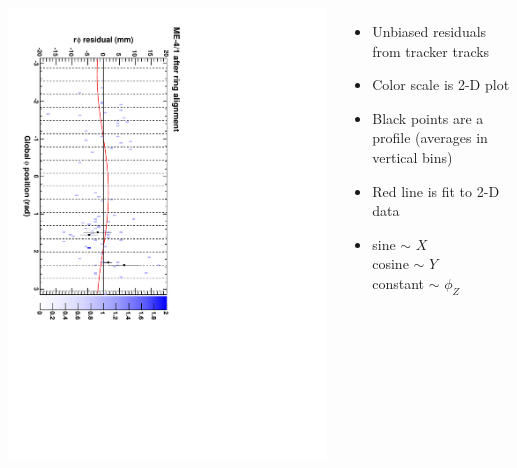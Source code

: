\documentclass[compress]{beamer}
\begin{document}
\begin{frame}
\begin{columns}
\includegraphics[height=\linewidth, angle=90]{ringfits_after/mem41.pdf}
\begin{itemize}
\item Unbiased residuals from tracker tracks
\item Color scale is 2-D plot
\item Black points are a profile (averages in vertical bins)
\item Red line is fit to 2-D data
\item sine $\sim$ $X$ \\
cosine $\sim$ $Y$ \\
constant $\sim$ $\phi_Z$
\end{itemize}
\end{columns}
\end{frame}
\end{document}
